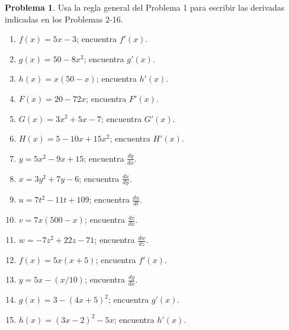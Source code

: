 \documentclass{article}
\theoremstyle{definition}
\newtheorem{problem}{Problema}
\begin{document}
\begin{problem}
Usa la regla general del Problema 1 para escribir las derivadas indicadas en los Problemas 2-16.
\begin{enumerate}
    \item \( f(x) = 5x - 3 \); encuentra \( f'(x) \).
    \item \( g(x) = 50 - 8x^2 \); encuentra \( g'(x) \).
    \item \( h(x) = x(50 - x) \); encuentra \( h'(x) \).
    \item \( F(x) = 20 - 72x \); encuentra \( F'(x) \).
    \item \( G(x) = 3x^2 + 5x - 7 \); encuentra \( G'(x) \).
    \item \( H(x) = 5 - 10x + 15x^2 \); encuentra \( H'(x) \).
    \item \( y = 5x^2 - 9x + 15 \); encuentra \( \frac{dy}{dx} \).
    \item \( x = 3y^2 + 7y - 6 \); encuentra \( \frac{dx}{dy} \).
    \item \( u = 7t^2 - 11t + 109 \); encuentra \( \frac{du}{dt} \).
    \item \( v = 7x(500 - x) \); encuentra \( \frac{dv}{dx} \).
    \item \( w = -7z^2 + 22z - 71 \); encuentra \( \frac{dw}{dz} \).
    \item \( f(x) = 5x(x + 5) \); encuentra \( f'(x) \).
    \item \( y = 5x - (x/10) \); encuentra \( \frac{dy}{dx} \).
    \item \( g(x) = 3 - (4x + 5)^2 \); encuentra \( g'(x) \).
    \item \( h(x) = (3x - 2)^2 - 5x \); encuentra \( h'(x) \).
\end{enumerate}
\end{problem}

\medskip
\end{document}
